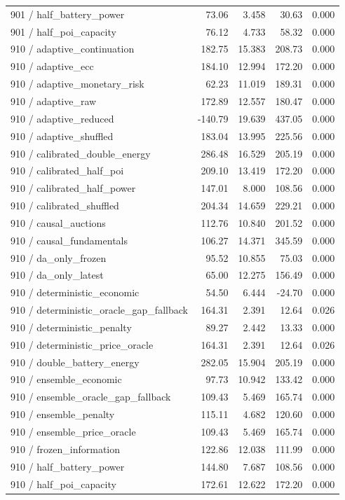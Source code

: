 \begin{longtable}{lrrrr}
901 / half\_battery\_power & 73.06 & 3.458 & 30.63 & 0.000\\
901 / half\_poi\_capacity & 76.12 & 4.733 & 58.32 & 0.000\\
910 / adaptive\_continuation & 182.75 & 15.383 & 208.73 & 0.000\\
910 / adaptive\_ecc & 184.10 & 12.994 & 172.20 & 0.000\\
910 / adaptive\_monetary\_risk & 62.23 & 11.019 & 189.31 & 0.000\\
910 / adaptive\_raw & 172.89 & 12.557 & 180.47 & 0.000\\
910 / adaptive\_reduced & -140.79 & 19.639 & 437.05 & 0.000\\
910 / adaptive\_shuffled & 183.04 & 13.995 & 225.56 & 0.000\\
910 / calibrated\_double\_energy & 286.48 & 16.529 & 205.19 & 0.000\\
910 / calibrated\_half\_poi & 209.10 & 13.419 & 172.20 & 0.000\\
910 / calibrated\_half\_power & 147.01 & 8.000 & 108.56 & 0.000\\
910 / calibrated\_shuffled & 204.34 & 14.659 & 229.21 & 0.000\\
910 / causal\_auctions & 112.76 & 10.840 & 201.52 & 0.000\\
910 / causal\_fundamentals & 106.27 & 14.371 & 345.59 & 0.000\\
910 / da\_only\_frozen & 95.52 & 10.855 & 75.03 & 0.000\\
910 / da\_only\_latest & 65.00 & 12.275 & 156.49 & 0.000\\
910 / deterministic\_economic & 54.50 & 6.444 & -24.70 & 0.000\\
910 / deterministic\_oracle\_gap\_fallback & 164.31 & 2.391 & 12.64 & 0.026\\
910 / deterministic\_penalty & 89.27 & 2.442 & 13.33 & 0.000\\
910 / deterministic\_price\_oracle & 164.31 & 2.391 & 12.64 & 0.026\\
910 / double\_battery\_energy & 282.05 & 15.904 & 205.19 & 0.000\\
910 / ensemble\_economic & 97.73 & 10.942 & 133.42 & 0.000\\
910 / ensemble\_oracle\_gap\_fallback & 109.43 & 5.469 & 165.74 & 0.000\\
910 / ensemble\_penalty & 115.11 & 4.682 & 120.60 & 0.000\\
910 / ensemble\_price\_oracle & 109.43 & 5.469 & 165.74 & 0.000\\
910 / frozen\_information & 122.86 & 12.038 & 111.99 & 0.000\\
910 / half\_battery\_power & 144.80 & 7.687 & 108.56 & 0.000\\
910 / half\_poi\_capacity & 172.61 & 12.622 & 172.20 & 0.000\\
\bottomrule
\end{longtable}
\endgroup
